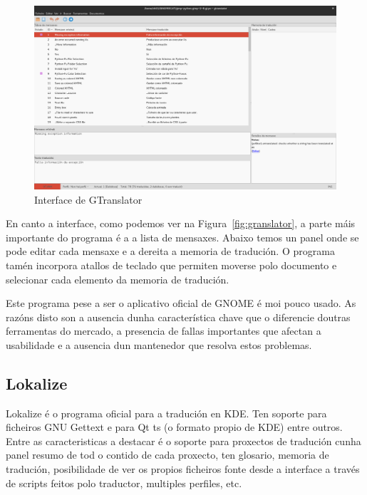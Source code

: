\begin{figure}[h]
    \centering
    \includegraphics[width=\textwidth]{img/captura_gtranslator.png}
    \caption[Interface de GTranslator]{Interface de GTranslator}
    \label{fig:gtranslator}
\end{figure}

En canto a interface, como podemos ver na Figura~\ref{fig:granslator}, a parte máis importante do programa é a a lista de mensaxes. Abaixo temos un panel onde se pode editar cada mensaxe e a dereita a memoria de tradución. O programa tamén incorpora atallos de teclado que permiten moverse polo documento e selecionar cada elemento da memoria de tradución.

Este programa pese a ser o aplicativo oficial de GNOME é moi pouco usado. As razóns disto son a ausencia dunha característica chave que o diferencie doutras ferramentas do mercado, a presencia de fallas importantes que afectan a usabilidade e a ausencia dun mantenedor que resolva estos problemas.

\subsection{Lokalize}
Lokalize é o programa oficial para a tradución en KDE. Ten soporte para ficheiros GNU Gettext e para Qt ts (o formato propio de KDE) entre outros. Entre as caracteristicas a destacar é o soporte para proxectos de tradución cunha panel resumo de tod o contido de cada proxecto, ten glosario, memoria de tradución, posibilidade de ver os propios ficheiros fonte desde a interface a través de scripts feitos polo traductor, multiples perfiles, etc.

